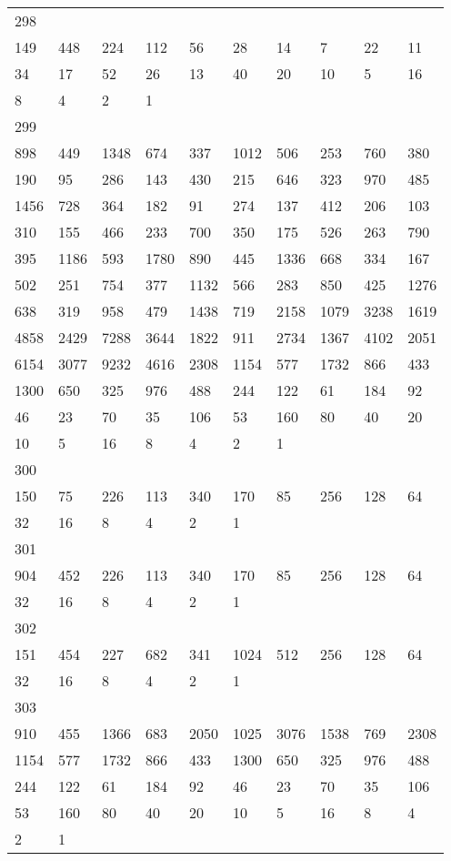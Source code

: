\begin{longtable}{*{10}{l}}
298&&&&&&&&&\\
149& 448& 224& 112& 56& 28& 14& 7& 22& 11\\
34& 17& 52& 26& 13& 40& 20& 10& 5& 16\\
8& 4& 2& 1& \\

299&&&&&&&&&\\
898& 449& 1348& 674& 337& 1012& 506& 253& 760& 380\\
190& 95& 286& 143& 430& 215& 646& 323& 970& 485\\
1456& 728& 364& 182& 91& 274& 137& 412& 206& 103\\
310& 155& 466& 233& 700& 350& 175& 526& 263& 790\\
395& 1186& 593& 1780& 890& 445& 1336& 668& 334& 167\\
502& 251& 754& 377& 1132& 566& 283& 850& 425& 1276\\
638& 319& 958& 479& 1438& 719& 2158& 1079& 3238& 1619\\
4858& 2429& 7288& 3644& 1822& 911& 2734& 1367& 4102& 2051\\
6154& 3077& 9232& 4616& 2308& 1154& 577& 1732& 866& 433\\
1300& 650& 325& 976& 488& 244& 122& 61& 184& 92\\
46& 23& 70& 35& 106& 53& 160& 80& 40& 20\\
10& 5& 16& 8& 4& 2& 1& \\

300&&&&&&&&&\\
150& 75& 226& 113& 340& 170& 85& 256& 128& 64\\
32& 16& 8& 4& 2& 1& \\

301&&&&&&&&&\\
904& 452& 226& 113& 340& 170& 85& 256& 128& 64\\
32& 16& 8& 4& 2& 1& \\

302&&&&&&&&&\\
151& 454& 227& 682& 341& 1024& 512& 256& 128& 64\\
32& 16& 8& 4& 2& 1& \\

303&&&&&&&&&\\
910& 455& 1366& 683& 2050& 1025& 3076& 1538& 769& 2308\\
1154& 577& 1732& 866& 433& 1300& 650& 325& 976& 488\\
244& 122& 61& 184& 92& 46& 23& 70& 35& 106\\
53& 160& 80& 40& 20& 10& 5& 16& 8& 4\\
2& 1& \\


\end{longtable}
